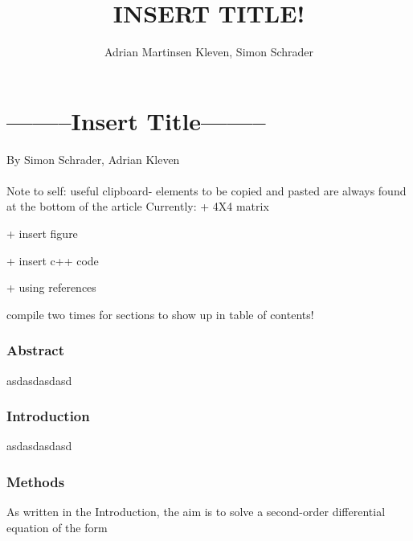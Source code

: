 \documentclass[10pt,a4paper]{article}
\author{Adrian Martinsen Kleven, Simon Schrader}
\title{INSERT TITLE!}
\begin{document}
\part*{--------Insert Title--------}
{\large By Simon Schrader, Adrian Kleven}\\\\
Note to self: 
useful clipboard- elements to be copied and pasted are always found at the bottom of the article
Currently:
 + 4X4 matrix 

 + insert figure

 + insert c++ code
 
 + using references
 
 compile two times for sections to show up in table of contents!


\tableofcontents

\listoffigures
\listoftables

 
\clearpage
 
\section{Abstract}
asdasdasdasd
\section{Introduction}
asdasdasdasd
\section{Methods}

As written in the Introduction, the aim is to solve a second-order differential equation of the form
\end{document}
